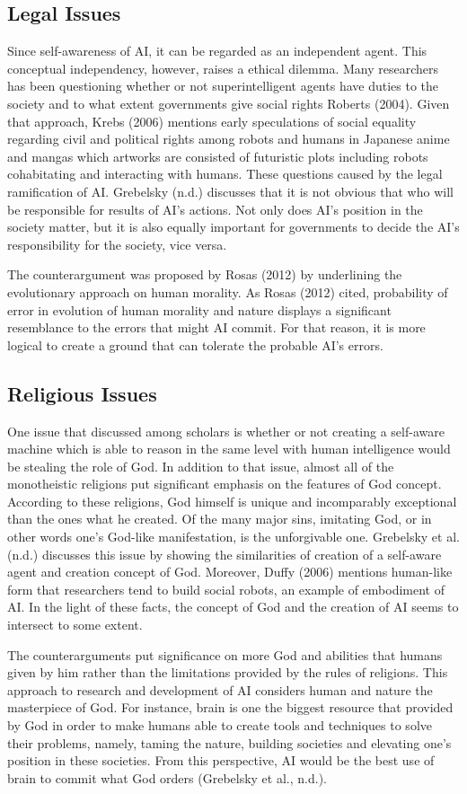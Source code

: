 \documentclass[man]{apa6}
\begin{document}
\subsection{Legal Issues}
Since self-awareness of AI, it can be regarded as an independent agent. This conceptual independency, however, raises a ethical dilemma. Many researchers has been questioning whether or not superintelligent agents have duties to the society and to what extent governments give social rights Roberts (2004). Given that approach, Krebs (2006) mentions early speculations of social equality
regarding civil and political rights among robots and humans in Japanese anime and mangas which artworks are consisted of futuristic plots including robots cohabitating and interacting with humans. These questions caused by the legal ramification of AI. Grebelsky (n.d.) discusses that it is not obvious that who will be responsible for results of AI's actions. Not only does AI's position in the society matter, but it is also equally important for governments to decide the AI's responsibility for the society, vice versa. \par
The counterargument was proposed by Rosas (2012) by underlining the evolutionary approach on human morality. As Rosas (2012) cited, probability of error in evolution of human morality and nature displays a significant resemblance to the errors that might AI commit. For that reason, it is more logical to create a ground that can tolerate the probable AI's errors.
\subsection{Religious Issues}
One issue that discussed among scholars is whether or not creating a self-aware machine which is able to reason in the same level with human intelligence would be stealing the role of God. In addition to that issue, almost all of the monotheistic religions put significant emphasis on the features of God concept. According to these religions, God himself is unique and incomparably exceptional than the ones what he created. Of the many major sins, imitating God, or in other words one's God-like manifestation, is the unforgivable one. Grebelsky et al. (n.d.) discusses this issue by showing the similarities of creation of a self-aware agent and creation concept of God. Moreover, Duffy (2006) mentions human-like form that researchers tend to build social robots, an example of embodiment of AI. In the light of these facts, the concept of God and the creation of AI seems to intersect to some extent.\par
The counterarguments put significance on more God and abilities that humans given by him rather than the limitations provided by the rules of religions. This approach to research and development of AI considers human and nature the masterpiece of God. For instance, brain is one the biggest resource that provided by God in order to make humans able to create tools and techniques to solve their problems, namely, taming the nature, building societies and elevating one's position in these societies. From this perspective, AI would be the best use of brain to commit what God orders (Grebelsky et al., n.d.).
\end{document}
